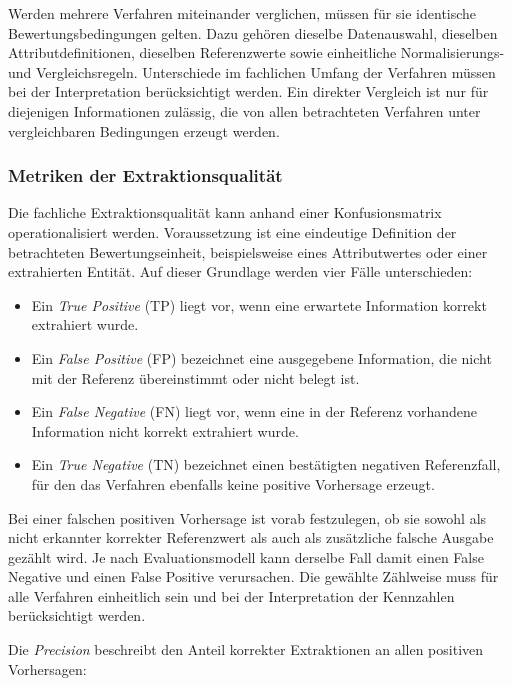 Werden mehrere Verfahren miteinander verglichen, müssen für sie identische Bewertungsbedingungen gelten. Dazu gehören dieselbe Datenauswahl, dieselben Attributdefinitionen, 
dieselben Referenzwerte sowie einheitliche Normalisierungs- und Vergleichsregeln. Unterschiede im fachlichen Umfang der Verfahren müssen bei der Interpretation 
berücksichtigt werden. Ein direkter Vergleich ist nur für diejenigen Informationen zulässig, die von allen betrachteten Verfahren unter vergleichbaren Bedingungen erzeugt werden.

\subsubsection{Metriken der Extraktionsqualität}

Die fachliche Extraktionsqualität kann anhand einer Konfusionsmatrix operationalisiert werden. Voraussetzung ist eine eindeutige Definition der betrachteten 
Bewertungseinheit, beispielsweise eines Attributwertes oder einer extrahierten Entität. Auf dieser Grundlage werden vier Fälle unterschieden:

\begin{itemize}
    \item Ein \emph{True Positive} (TP) liegt vor, wenn eine erwartete Information korrekt extrahiert wurde.
    \item Ein \emph{False Positive} (FP) bezeichnet eine ausgegebene Information, die nicht mit der Referenz übereinstimmt oder nicht belegt ist.
    \item Ein \emph{False Negative} (FN) liegt vor, wenn eine in der Referenz vorhandene Information nicht korrekt extrahiert wurde.
    \item Ein \emph{True Negative} (TN) bezeichnet einen bestätigten negativen Referenzfall, für den das Verfahren ebenfalls keine positive Vorhersage erzeugt.
\end{itemize}

Bei einer falschen positiven Vorhersage ist vorab festzulegen, ob sie sowohl als nicht erkannter korrekter Referenzwert als auch als zusätzliche falsche Ausgabe gezählt 
wird. Je nach Evaluationsmodell kann derselbe Fall damit einen False Negative und einen False Positive verursachen. Die gewählte Zählweise muss für alle Verfahren einheitlich 
sein und bei der Interpretation der Kennzahlen berücksichtigt werden.

Die \emph{Precision} beschreibt den Anteil korrekter Extraktionen an allen positiven Vorhersagen:

